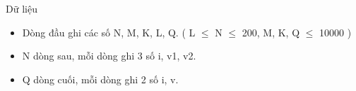 Dữ liệu    
\begin{itemize}
	\item        Dòng đầu ghi    các số N, M, K, L, Q. ( L  $\le$  N  $\le$  200, M, K, Q  $\le$  10000    )      
	\item        N dòng sau, mỗi    dòng ghi 3 số i, v1, v2.      
	\item        Q dòng cuối,    mỗi dòng ghi 2 số i, v.      
\end{itemize}